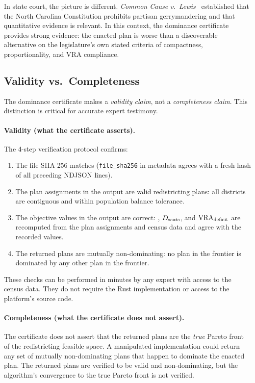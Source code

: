 In state court, the picture is different.
\textit{Common Cause v.\ Lewis}~\citeyear{common_cause_lewis} established that
the North Carolina Constitution prohibits partisan gerrymandering and that
quantitative evidence is relevant.
In this context, the dominance certificate provides strong evidence:
the enacted plan is worse than a discoverable alternative on the
legislature's own stated criteria of compactness, proportionality, and
VRA compliance.

\subsection{Validity vs.\ Completeness}

The dominance certificate makes a \emph{validity claim}, not a
\emph{completeness claim}.
This distinction is critical for accurate expert testimony.

\paragraph{Validity (what the certificate asserts).}
The 4-step verification protocol confirms:
\begin{enumerate}
\item The file SHA-256 matches (\texttt{file\_sha256} in metadata agrees
  with a fresh hash of all preceding NDJSON lines).
\item The plan assignments in the output are valid redistricting plans:
  all districts are contiguous and within population balance tolerance.
\item The objective values in the output are correct: \EC{}, $D_{\mathrm{seats}}$,
  and $\mathrm{VRA}_{\mathrm{deficit}}$ are recomputed from the plan assignments and census data
  and agree with the recorded values.
\item The returned plans are mutually non-dominating: no plan in the
  frontier is dominated by any other plan in the frontier.
\end{enumerate}
These checks can be performed in minutes by any expert with access to the
census data.
They do not require the Rust implementation or access to the platform's
source code.

\paragraph{Completeness (what the certificate does not assert).}
The certificate does not assert that the returned plans are the \emph{true}
Pareto front of the redistricting feasible space.
A manipulated implementation could return any set of mutually non-dominating
plans that happen to dominate the enacted plan.
The returned plans are verified to be valid and non-dominating, but the
algorithm's convergence to the true Pareto front is not verified.


